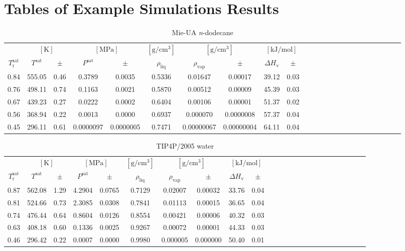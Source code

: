 \documentclass[%
 aip,
 jcp,
 sd,%
 amsmath,amssymb,
]{revtex4-1}
\begin{document}
\clearpage
\section{Tables of Example Simulations Results}
\begin{table*}[!htbp]
\centering
\caption{
Mie-UA \textit{n}-dodecane
}
\label{tab:Mie-C12-mie}
\begin{ruledtabular}
\begin{tabular}{cccccccccccccccccccccccc}
 & \multicolumn{2}{c}{$[\mathrm{K}]$} &	 \multicolumn{2}{c}{$[\mathrm{MPa}]$} & $[\mathrm{g/cm^3}]$ & \multicolumn{2}{c}{$[\mathrm{g/cm^3}]$} & \multicolumn{2}{c}{$[\mathrm{kJ/mol}]$} \\
$T_\mathrm{r}^{\mathrm{sat}}$ & $T^{\mathrm{sat}}$ & $\pm$ & $P^{\mathrm{sat}}$ & $\pm$ & $\rho_{\mathrm{liq}}$ & $\rho_{\mathrm{vap}}$ & $\pm$ & $\Delta H_{\mathrm{v}}$ & $\pm$
 \\
\hline		
0.84	&	555.05	&	0.46	&	0.3789	&	0.0035	&	0.5336	&	0.01647	&	0.00017	&	39.12	&	0.03	\\
0.76	&	498.11	&	0.74	&	0.1163	&	0.0021	&	0.5870	&	0.00512	&	0.00009	&	45.39	&	0.03	\\
0.67	&	439.23	&	0.27	&	0.0222	&	0.0002	&	0.6404	&	0.00106	&	0.00001	&	51.37	&	0.02	\\
0.56	&	368.94	&	0.22	&	0.0013	&	0.0000	&	0.6937	&	0.000070	&	0.0000008	&	57.37	&	0.04	\\
0.45	&	296.11	&	0.61	&	0.0000097	&	0.0000005	&	0.7471	&	0.00000067	&	0.00000004	&	64.11	&	0.04	\\
\end{tabular}
\end{ruledtabular}
\end{table*}


\begin{table*}[!htbp]
\centering
\caption{
TIP4P/2005 water
}
\label{tab:TIP4P2005-water-nistsim}
\begin{ruledtabular}
\begin{tabular}{cccccccccccccccccccccccc}
 & \multicolumn{2}{c}{$[\mathrm{K}]$} &	 \multicolumn{2}{c}{$[\mathrm{MPa}]$} & $[\mathrm{g/cm^3}]$ & \multicolumn{2}{c}{$[\mathrm{g/cm^3}]$} & \multicolumn{2}{c}{$[\mathrm{kJ/mol}]$} \\
$T_\mathrm{r}^{\mathrm{sat}}$ & $T^{\mathrm{sat}}$ & $\pm$ & $P^{\mathrm{sat}}$ & $\pm$ & $\rho_{\mathrm{liq}}$ & $\rho_{\mathrm{vap}}$ & $\pm$ & $\Delta H_{\mathrm{v}}$ & $\pm$
 \\
\hline		
0.87	&	562.08	&	1.29	&	4.2904	&	0.0765	&	0.7129	&	0.02007	&	0.00032	&	33.76	&	0.04	\\
0.81	&	524.66	&	0.73	&	2.3085	&	0.0308	&	0.7841	&	0.01113	&	0.00015	&	36.65	&	0.04	\\
0.74	&	476.44	&	0.64	&	0.8604	&	0.0126	&	0.8554	&	0.00421	&	0.00006	&	40.32	&	0.03	\\
0.63	&	408.18	&	0.60	&	0.1336	&	0.0025	&	0.9267	&	0.00072	&	0.00001	&	44.33	&	0.03	\\
0.46	&	296.42	&	0.22	&	0.0007	&	0.0000	&	0.9980	&	0.000005	&	0.000000	&	50.40	&	0.01	\\
\end{tabular}
\end{ruledtabular}
\end{table*}
\end{document}
